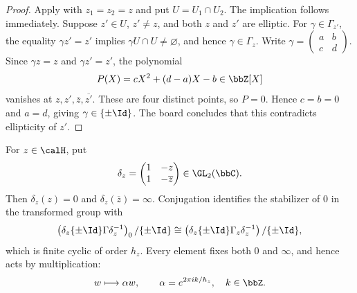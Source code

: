 \begin{proof}
    Apply  with $z_1 = z_2 = z$ and put $U = U_1 \cap U_2$. The implication follows immediately. Suppose $z' \in U$, $z' \neq z$, and both $z$ and $z'$ are elliptic. For $\gamma \in \Gamma_{z'}$, the equality $\gamma z' = z'$ implies $\gamma U \cap U \neq \varnothing$, and hence $\gamma \in \Gamma_z$.
    Write $\gamma = \begin{pmatrix}a & b\\ c & d\end{pmatrix}$. Since $\gamma z = z$ and $\gamma z' = z'$, the polynomial
    \[
        P(X) = cX^2 + (d - a)X - b \in \bbZ[X]
    \]
    vanishes at $z, z', \overline z, \overline{z'}$. These are four distinct points, so $P = 0$. Hence $c = b = 0$ and $a = d$, giving $\gamma \in \{\pm\Id\}$. The board concludes that this contradicts ellipticity of $z'$.
\end{proof}

For $z \in \calH$, put
\[
    \delta_z = \begin{pmatrix}1 & -z\\ 1 & -\overline z\end{pmatrix} \in \GL_2(\bbC).
\]
Then $\delta_z(z) = 0$ and $\delta_z(\overline z) = \infty$. Conjugation identifies the stabilizer of $0$ in the transformed group with
\[
    \left(\delta_z\{\pm\Id\}\Gamma\delta_z^{-1}\right)_0/\{\pm\Id\} \cong \left(\delta_z\{\pm\Id\}\Gamma_z\delta_z^{-1}\right)/\{\pm\Id\},
\]
which is finite cyclic of order $h_z$. Every element fixes both $0$ and $\infty$, and hence acts by multiplication:
\[
    w \longmapsto \alpha w, \qquad \alpha = e^{2\pi i k/h_z}, \quad k \in \bbZ.
\]

